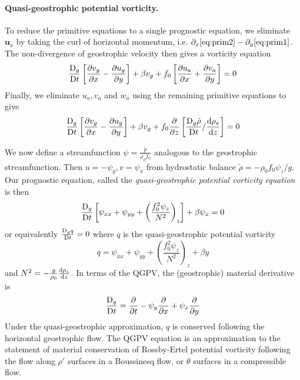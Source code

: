 \documentclass{jknotes}
\begin{document}
\paragraph{Quasi-geostrophic potential vorticity.} 
To reduce the primitive equations to a single
prognostic equation, we eliminate $\symbf{u}_a$ by taking the curl of horizontal
momentum, i.e. $\partial_x \eqref{eq:prim2} - \partial_y \eqref{eq:prim1}$.
The non-divergence of geostrophic velocity then gives a vorticity equation
\begin{equation}
	\frac{\mathrm{D}_g}{\mathrm{D} t} \left[ \frac{\partial v_g}{\partial x} -
		\frac{\partial u_g}{\partial y} \right] + \beta v_g + f_0 \left[
		\frac{\partial u_a}{\partial x} + \frac{\partial v_a}{\partial y}
	\right] = 0
\end{equation}
Finally, we eliminate $u_a, v_a$ and $w_a$ using the remaining primitive
equations to give
\begin{equation}
	\frac{\diffD_g}{\diffD t} \left[ \frac{\partial v_g}{\partial x} -
		\frac{\partial u_g}{\partial y} \right] + \beta v_g +
		f_0\frac{\partial}{\partial z} \left[ \frac{\diffD_g
		\tilde{\rho}}{\diffD t} / \frac{\diffd \rho_s}{\diffd z}\right] = 0
\end{equation}

We now define a streamfunction $\psi = \frac{\tilde{p}}{\rho_0 f_0}$ analogous
to the geostrophic streamfunction. Then $u = -\psi_y, v = \psi_x$ from
hydrostatic balance $\tilde{\rho} = - \rho_0 f_0 \psi_z / g$. Our prognostic
equation, called the \emph{quasi-geostrophic potential vorticity equation} is
then
\begin{equation}
	\frac{\mathrm{D}_g}{\mathrm{D} t} \left[ \psi_{xx} + \psi_{yy} + \left(\frac{f_0^2
	\psi_z}{N^2}\right)_z \right] + \beta \psi_x = 0\label{eq:qgpv}
\end{equation}
or equivalently $\frac{\mathrm{D}_g q}{\mathrm{D} t} = 0$ where $q$ is the
quasi-geostrophic potential vorticity
\begin{equation}
	q = \psi_{xx} + \psi_{yy} + \left( \frac{f_0^2 \psi_z}{N^2}\right)_z +
	\beta y
\end{equation}
and $N^2 = -\frac{g}{\rho_0} \frac{\diffd \rho_s}{\diffd z}$. In terms of the
QGPV, the (geostrophic) material derivative is
\begin{equation}
	\frac{\mathrm{D}_g}{\mathrm{D} t} = \frac{\partial}{\partial t} - \psi_y
	\frac{\partial}{\partial x} + \psi_x \frac{\partial}{\partial y}
\end{equation}
Under the quasi-geostrophic approximation, $q$ is conserved following the
horizontal geostrophic flow. The QGPV equation is an approximation to the
statement of material conservation of Rossby-Ertel potential vorticity
following the flow along $\rho'$ surfaces in a Boussinesq flow, or $\theta$
surfaces in a compressible flow.
\end{document}
